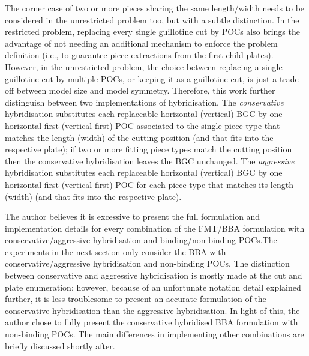 \documentclass[ppgc,tese,english,formais,babel]{iiufrgs}
\begin{document}
The corner case of two or more pieces sharing the same length/width needs to be considered in the unrestricted problem too, but with a subtle distinction.
In the restricted problem, replacing every single guillotine cut by POCs also brings the advantage of not needing an additional mechanism to enforce the problem definition (i.e., to guarantee piece extractions from the first child plates).
However, in the unrestricted problem, the choice between replacing a single guillotine cut by multiple POCs, or keeping it as a guillotine cut, is just a trade-off between model size and model symmetry.
Therefore, this work further distinguish between two implementations of hybridisation.
The \emph{conservative} hybridisation substitutes each replaceable horizontal (vertical) BGC by one horizontal-first (vertical-first) POC associated to the single piece type that matches the length (width) of the cutting position (and that fits into the respective plate); if two or more fitting piece types match the cutting position then the conservative hybridisation leaves the BGC unchanged.
The \emph{aggressive} hybridisation substitutes each replaceable horizontal (vertical) BGC by one horizontal-first (vertical-first) POC for each piece type that matches its length (width) (and that fits into the respective plate).

The author believes it is excessive to present the full formulation and implementation details for every combination of the FMT/BBA formulation with conservative/aggressive hybridisation and binding/non-binding POCs.The experiments in the next section only consider the BBA with conservative/aggressive hybridisation and non-binding POCs.
The distinction between conservative and aggressive hybridisation is mostly made at the cut and plate enumeration; however, because of an unfortunate notation detail explained further, it is less troublesome to present an accurate formulation of the conservative hybridisation than the aggressive hybridisation.
In light of this, the author chose to fully present the conservative hybridised BBA formulation with non-binding POCs.
The main differences in implementing other combinations are briefly discussed shortly after.
\end{document}
